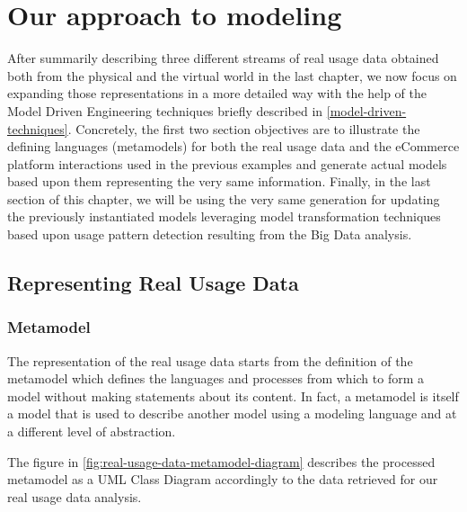 \chead{}
\chapter{Our approach to modeling}

After summarily describing three different streams of real usage data obtained both from the physical and the virtual world in the last chapter, we now focus on expanding those representations in a more detailed way with the help of the Model Driven Engineering techniques briefly described in \ref{model-driven-techniques}. 
Concretely, the first two section objectives are to illustrate the defining languages (metamodels) for both the real usage data and the eCommerce platform interactions used in the previous examples and generate actual models based upon them representing the very same information.
Finally, in the last section of this chapter, we will be using the very same generation for updating the previously instantiated models leveraging model transformation techniques based upon usage pattern detection resulting from the Big Data analysis.

\section{Representing Real Usage Data}

\subsection{Metamodel}

The representation of the real usage data starts from the definition of the metamodel which defines the languages and processes from which to form a model without making statements about its content. In fact, a metamodel is itself a model that is used to describe another model using a modeling language and at a different level of abstraction.  

The figure in \ref{fig:real-usage-data-metamodel-diagram} describes the processed metamodel as a UML Class Diagram accordingly to the data retrieved for our real usage data analysis.

